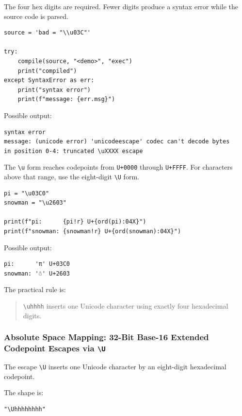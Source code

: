 The four hex digits are required. Fewer digits produce a syntax error while the source code is parsed.

\begin{verbatim}
source = 'bad = "\\u03C"'

try:
    compile(source, "<demo>", "exec")
    print("compiled")
except SyntaxError as err:
    print("syntax error")
    print(f"message: {err.msg}")
\end{verbatim}

Possible output:

\begin{verbatim}
syntax error
message: (unicode error) 'unicodeescape' codec can't decode bytes
in position 0-4: truncated \uXXXX escape
\end{verbatim}

The \texttt{\textbackslash u} form reaches codepoints from \texttt{U+0000} through \texttt{U+FFFF}. For characters above that range, use the eight-digit \texttt{\textbackslash U} form.

\begin{verbatim}
pi = "\u03C0"
snowman = "\u2603"

print(f"pi:      {pi!r} U+{ord(pi):04X}")
print(f"snowman: {snowman!r} U+{ord(snowman):04X}")
\end{verbatim}

Possible output:

\begin{verbatim}
pi:      'π' U+03C0
snowman: '☃' U+2603
\end{verbatim}

The practical rule is:

\begin{quote}
\texttt{\textbackslash uhhhh} inserts one Unicode character using exactly four hexadecimal digits.
\end{quote}

\subsubsection{Absolute Space Mapping: 32-Bit Base-16 Extended Codepoint Escapes via \texttt{\textbackslash U}}

The escape \texttt{\textbackslash U} inserts one Unicode character by an eight-digit hexadecimal codepoint.

The shape is:

\begin{verbatim}
"\Uhhhhhhhh"
\end{verbatim}

